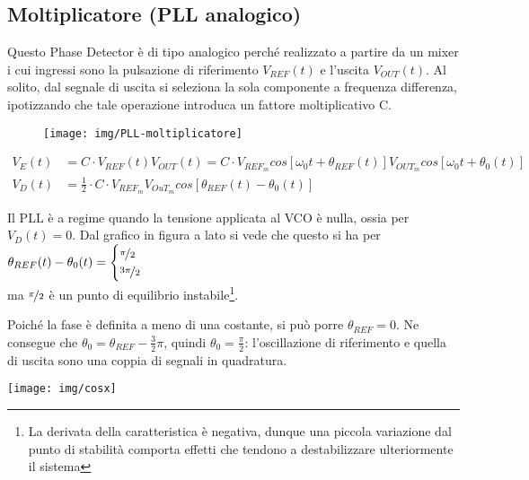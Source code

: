 \subsection{Moltiplicatore (PLL analogico)}
Questo Phase Detector è di tipo analogico perché realizzato a partire da un mixer i cui ingressi sono la pulsazione di riferimento $V_{REF}(t)$ e l'uscita $V_{OUT}(t)$. Al solito, dal segnale di uscita si seleziona la sola componente a frequenza differenza, ipotizzando che tale operazione introduca un fattore moltiplicativo C.

\begin{figure}[hbt]
	\centering
	\texttt{[image: img/PLL-moltiplicatore]}
	\caption{}
	\label{fig:pll-moltiplicatore}
\end{figure}

\begin{align*}
V_E(t) & =  C \cdot V_{REF}(t) V_{OUT}(t) = C \cdot  V_{{REF}_m} cos \left[ \omega_0 t + \theta_{REF}(t)\right]
V_{{OUT}_m} cos \left[ \omega_0 t + \theta_0(t)\right]
\\
V_D(t) & = \frac{1}{2} \cdot C \cdot V_{{REF}_m}V_{{OuT}_m} cos \left[ \theta_{REF}(t) -\theta_0(t) \right]
\end{align*}


\begin{multicols}{2}
	Il PLL è a regime quando la tensione applicata al VCO è nulla, ossia per $V_D(t) = 0$. Dal grafico in figura a lato si vede che questo si ha per\\ $\theta_{REF} (t) - \theta_0(t) = \begin{cases}\nicefrac{\pi}{2}\\\nicefrac{3\pi}{2}\end{cases}$
	\\ma $\nicefrac{\pi}{2}$ è un punto di equilibrio instabile\footnote{La derivata della caratteristica è negativa, dunque una piccola variazione dal punto di stabilità comporta effetti che tendono a destabilizzare ulteriormente il sistema}.
	
	Poiché la fase è definita a meno di una costante, si può porre $\theta_{REF} = 0$. Ne consegue che $\theta_0 = \theta_{REF} - \frac{3}{2}\pi$, quindi $\theta_0 = \frac{\pi}{2}$: l'oscillazione di riferimento e quella di uscita sono una coppia di segnali in quadratura.	
	
	\columnbreak
	\centering
	\null\vfill
	\texttt{[image: img/cosx]}
	\vfill\null
\end{multicols}

